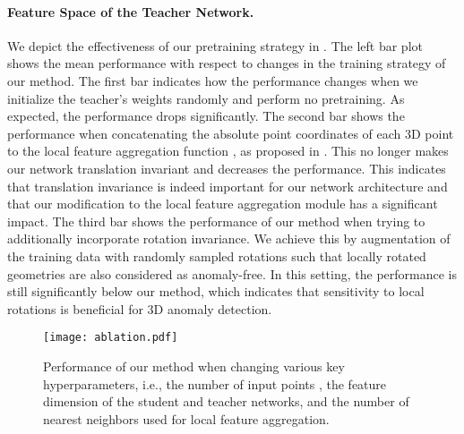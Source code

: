 \documentclass[twoside,11pt]{article}
\begin{document}
\paragraph{\textbf{Feature Space of the Teacher Network.}} We depict the effectiveness of our pretraining strategy in . The left bar plot shows the mean performance with respect to changes in the training strategy of our method. The first bar indicates how the performance changes when we initialize the teacher's weights randomly and perform no pretraining. As expected, the performance drops significantly. The second bar shows the performance when concatenating the absolute point coordinates of each 3D point to the local feature aggregation function , as proposed in \citep{hu2019randla}.
This no longer makes our network translation invariant and decreases the performance. This indicates that translation invariance is indeed important for our network architecture and that our modification to the local feature aggregation module has a significant impact. The third bar shows the performance of our method when trying to additionally incorporate rotation invariance. We achieve this by augmentation of the training data with randomly sampled rotations such that locally rotated geometries are also considered as anomaly-free. In this setting, the performance is still significantly below our method, which indicates that sensitivity to local rotations is beneficial for 3D anomaly detection.

\begin{figure}[ht]
    \centering
\texttt{[image: ablation.pdf]}
    \caption{Performance of our method when changing various key hyperparameters, i.e., the number of input points , the feature dimension  of the student and teacher networks, and the number of nearest neighbors  used for local feature aggregation.}
    \label{fig:ablation_study}
\end{figure}
\end{document}

